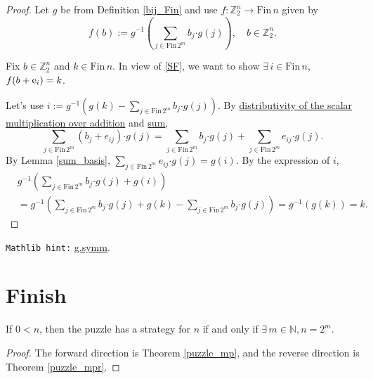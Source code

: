 \documentclass[11pt]{amsart}
\newcommand{\Zz}{\mathbb{Z}_2}
\newcommand{\Fin}{\mathrm{Fin}\,}
\newcommand{\B}{\color{blue}}
\begin{document}
\begin{proof}
{\B Let} $g$ be from Definition \ref{bij_Fin} and {\B use} $f : \Zz^n \to \Fin n$ given by
$$f(b) := g^{-1}\left(\sum_{j\in\Fin 2^m} b_j \boldsymbol{\cdot} g(j)\right), \quad b\in\Zz^n.$$

Fix $b\in\Zz^n$ and $k\in\Fin n$. In view of \eqref{SF}, we want to show $\exists\,i\in\Fin n$, $f(b+{\rm e}_i) = k$.

{\B Let}'s {\B use} $i := g^{-1}\left(g(k) - \sum_{j\in\Fin 2^m} b_j \boldsymbol{\cdot} g(j)\right)$. By \href{https://leanprover-community.github.io/mathlib4_docs/Mathlib/Algebra/Module/Defs.html#add_smul}{distributivity of the scalar multiplication over addition} and \href{https://leanprover-community.github.io/mathlib4_docs/Mathlib/Algebra/BigOperators/Group/Finset/Basic.html#Finset.sum_add_distrib}{sum},
$$\sum_{j\in\Fin 2^m} (b_j + e_{ij}) \boldsymbol{\cdot} g(j) = \sum_{j\in\Fin 2^m} b_j \boldsymbol{\cdot} g(j) + \sum_{j\in\Fin 2^m} e_{ij} \boldsymbol{\cdot} g(j).$$
By Lemma \ref{sum_basis}, $\sum_{j\in\Fin 2^m} e_{ij} \boldsymbol{\cdot} g(j) = g(i)$. By the expression of $i$, 
\begin{align*}
& g^{-1}\left(\sum_{j\in\Fin 2^m} b_j \boldsymbol{\cdot} g(j) + g(i)\right) \\
&= g^{-1}\left(\sum_{j\in\Fin 2^m} b_j \boldsymbol{\cdot} g(j) + g(k) - \sum_{j\in\Fin 2^m} b_j \boldsymbol{\cdot} g(j)\right) = g^{-1}(g(k)) = k.
\end{align*}
\end{proof}

\verb|Mathlib hint:| \href{https://leanprover-community.github.io/mathlib4_docs/Mathlib/Logic/Equiv/Defs.html#Equiv.symm}{g.symm}.

\bigskip

\section{Finish}

\begin{theorem}
    \label{puzzle}
If $0 < n$, then the puzzle has a strategy for $n$ if and only if  $\exists\,m \in \mathbb{N}, n = 2^m$.
\end{theorem}

\begin{proof}
The forward direction is Theorem \ref{puzzle_mp}, and the reverse direction is Theorem \ref{puzzle_mpr}.
\end{proof}
\end{document}
